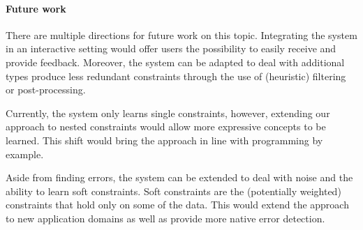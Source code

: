 \documentclass{sig-alternate-05-2015}
\begin{document}
\paragraph{Future work}
There are multiple directions for future work on this topic.
Integrating the system in an interactive setting would offer users the possibility to easily receive and provide feedback.
Moreover, the system can be adapted to deal with additional types produce less redundant constraints through the use of (heuristic) filtering or post-processing.

Currently, the system only learns single constraints, however, extending our approach to nested constraints would allow more expressive concepts to be learned.
This shift would bring the approach in line with programming by example.

Aside from finding errors, the system can be extended to deal with noise and the ability to learn soft constraints.
Soft constraints are the (potentially weighted) constraints that hold only on some of the data.
This would extend the approach to new application domains as well as provide more native error detection.



\end{document}

